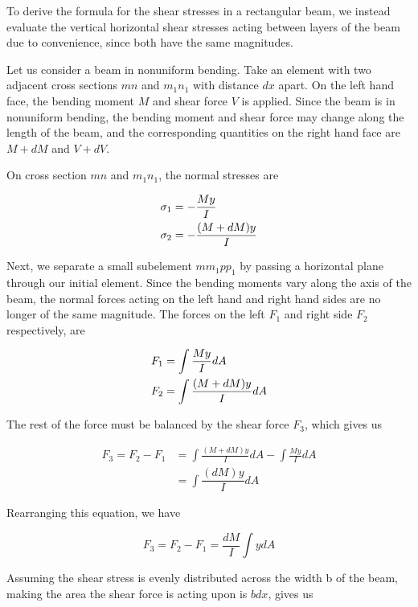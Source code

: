 \documentclass[
10pt,
a4paper,
openany,
svgnames,
]{kaobook} %
\begin{document}
To derive the formula for the shear stresses in a rectangular beam, we instead evaluate the vertical horizontal shear stresses acting between layers of the beam due to convenience, since both have the same magnitudes.

Let us consider a beam in nonuniform bending. Take an element with two adjacent cross sections $mn$ and $m_1n_1$ with distance $dx$ apart. On the left hand face, the bending moment $M$ and shear force $V$ is applied. Since the beam is in nonuniform bending, the bending moment and shear force may change along the length of the beam, and the corresponding quantities on the right hand face are $M + dM$ and $V + dV$.

On cross section $mn$ and $m_1n_1$, the normal stresses are

\[\begin{gathered}
  \sigma _1 =  - \frac{My}{I} \hfill \\
  \sigma _2 =  - \frac{(M + dM)y}{I} \hfill \\ 
\end{gathered} \]

Next, we separate a small subelement $mm_1pp_1$ by passing a horizontal plane through our initial element. Since the bending moments vary along the axis of the beam, the normal forces acting on the left hand and right hand sides are no longer of the same magnitude. The forces on the left $F_1$ and right side $F_2$ respectively, are

\[\begin{gathered}
    F_1 = \int \frac{My}{I}dA \hfill \\
    F_2 = \int \frac{(M + dM)y}{I}dA \hfill \\ 
  \end{gathered} \]

The rest of the force must be balanced by the shear force $F_3$, which gives us

\begin{align*}
  F_3 = F_2 - F_1 &= \int \frac{(M + dM)y}{I}dA  - \int \frac{My}{I}dA  \\ 
                        &= \int \dfrac{(dM)y}{I}dA 
 \end{align*}

 Rearranging this equation, we have

\begin{equation} \label{eqn: shear stress eval}
  F_3 = F_2 - F_1 = \frac{dM}{I}\int y dA
\end{equation}

Assuming the shear stress is evenly distributed across the width b of the beam, making the area the shear force is acting upon is $bdx$, gives us
\end{document}
